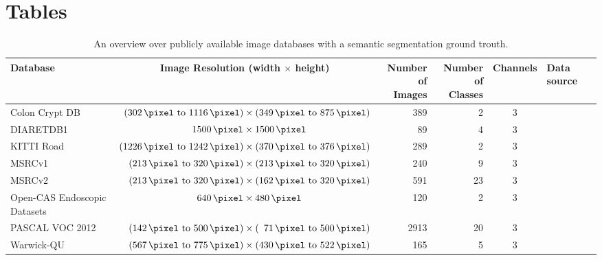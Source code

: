 
\clearpage\onecolumn
\section{Tables}
\begin{table}[ht]
    \centering
    \begin{tabular}{p{3cm}crrcl}
    \toprule
    Database        & Image Resolution (width $\times$ height) & \parbox{1cm}{\centering Number of\\Images}  & \parbox{1cm}{\centering Number of\\Classes}  & Channels & Data source\\\midrule
    Colon Crypt DB  & $\hphantom{0}(\SIrange{302}{1116}{\pixel}) \times (\SIrange{349}{875}{\pixel})$             &  \num{389} &  2 & 3        & \cite{colon-crypt-segmentation-db}\\
    DIARETDB1       & $\hphantom{00}\SI{1500}{\pixel} \times \SI{1500}{\pixel}$                                   &   \num{89} &  4 & 3        & \cite{kalesnykiene2014diaretdb1}\\
    KITTI Road      & $(\SIrange{1226}{1242}{\pixel}) \times (\SIrange{370}{376}{\pixel})$                        &  \num{289} &  2 & 3        & \cite{Fritsch2013ITSC}\\
    MSRCv1          & $\hphantom{00}(\SIrange{213}{320}{\pixel}) \times (\SIrange{213}{320}{\pixel})$             &  \num{240} &  9 & 3        & \cite{MSRC-data}\\
    MSRCv2          & $\hphantom{00}(\SIrange{213}{320}{\pixel}) \times (\SIrange{162}{320}{\pixel})$             &  \num{591} & 23 & 3        & \cite{MSRC-data}\\
    Open-CAS Endoscopic Datasets & $\hphantom{00}\SI{640}{\pixel} \times \SI{480}{\pixel}$                        &  \num{120} &  2 & 3        & \cite{maier2014can}\\
    PASCAL VOC 2012 & $\hphantom{00}(\SIrange{142}{500}{\pixel}) \times (\hphantom{0}\SIrange{71}{500}{\pixel})$  & \num{2913} & 20 & 3        & \cite{pascal-voc-2012-data}  \\
    Warwick-QU      & $\hphantom{00}(\SIrange{567}{775}{\pixel}) \times (\SIrange{430}{522}{\pixel})$             &  \num{165} &  5 & 3        & \cite{coelho2009nuclear}\\
    \bottomrule
    \end{tabular}
    \caption{An overview over publicly available image databases with a semantic segmentation ground trouth.}
    \label{table:segmentation-databases}
\end{table}
